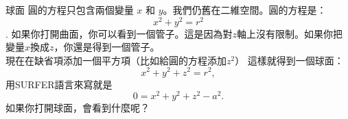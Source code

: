 \begin{surferPage}{球面}
圓的方程只包含兩個變量 $x$ 和 $y$。我們仍舊在二維空間。圓的方程是：
\[x^2+y^2=r^2\].
如果你打開曲面，你可以看到一個管子。這是因為對$z$軸上沒有限制。如果你把變量$x$換成$z$，你還是得到一個管子。\\
現在在缺省項添加一個平方項（比如給圓的方程添加$z^2$）
這樣就得到一個球面：
\[x^2+y^2+z^2=r^2,\]
用SURFER語言來寫就是
\[0=x^2+y^2+z^2-a^2.\]
如果你打開球面，會看到什麼呢？
\end{surferPage}
